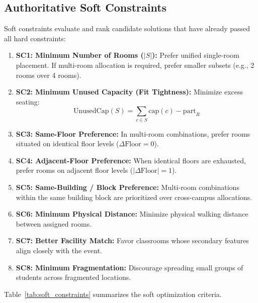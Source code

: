\documentclass[conference]{IEEEtran}
\begin{document}
\subsection{Authoritative Soft Constraints}
Soft constraints evaluate and rank candidate solutions that have already passed all hard constraints:
\begin{enumerate}
    \item \textbf{SC1: Minimum Number of Rooms ($|S|$):} Prefer unified single-room placement. If multi-room allocation is required, prefer smaller subsets (e.g., 2 rooms over 4 rooms).
    \item \textbf{SC2: Minimum Unused Capacity (Fit Tightness):} Minimize excess seating:
    \begin{equation}
    \text{UnusedCap}(S) = \sum_{c \in S} \text{cap}(c) - \text{part}_R
    \end{equation}
    \item \textbf{SC3: Same-Floor Preference:} In multi-room combinations, prefer rooms situated on identical floor levels ($\Delta \text{Floor} = 0$).
    \item \textbf{SC4: Adjacent-Floor Preference:} When identical floors are exhausted, prefer rooms on adjacent floor levels ($|\Delta \text{Floor}| = 1$).
    \item \textbf{SC5: Same-Building / Block Preference:} Multi-room combinations within the same building block are prioritized over cross-campus allocations.
    \item \textbf{SC6: Minimum Physical Distance:} Minimize physical walking distance between assigned rooms.
    \item \textbf{SC7: Better Facility Match:} Favor classrooms whose secondary features align closely with the event.
    \item \textbf{SC8: Minimum Fragmentation:} Discourage spreading small groups of students across fragmented locations.
\end{enumerate}

Table~\ref{tab:soft_constraints} summarizes the soft optimization criteria.
\end{document}
